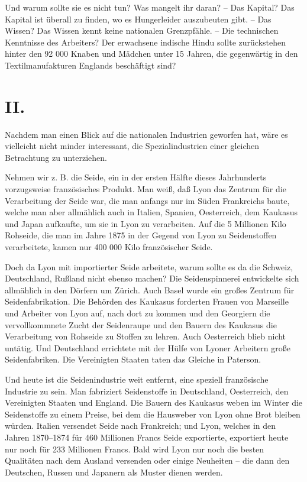 \documentclass{scrbook}
\begin{document}
Und warum sollte sie es nicht tun? Was mangelt ihr daran? – Das Kapital? Das Kapital ist überall zu finden, wo es Hungerleider auszubeuten gibt. – Das Wissen? Das Wissen kennt keine nationalen Grenzpfähle. – Die technischen Kenntnisse des Arbeiters? Der erwachsene indische Hindu sollte zurückstehen hinter den 92 000 Knaben und Mädchen unter 15 Jahren, die gegenwärtig in den Textilmanufakturen Englands beschäftigt sind?

\section*{II.}

Nachdem man einen Blick auf die nationalen Industrien geworfen hat, wäre es vielleicht nicht minder interessant, die Spezialindustrien einer gleichen Betrachtung zu unterziehen.

Nehmen wir z. B. die Seide, ein in der ersten Hälfte dieses Jahrhunderts vorzugsweise französisches Produkt. Man weiß, daß Lyon das Zentrum für die Verarbeitung der Seide war, die man anfangs nur im Süden Frankreichs baute, welche man aber allmählich auch in Italien, Spanien, Oesterreich, dem Kaukasus und Japan aufkaufte, um sie in Lyon zu verarbeiten. Auf die 5 Millionen Kilo Rohseide, die man im Jahre 1875 in der Gegend von Lyon zu Seidenstoffen verarbeitete, kamen nur 400 000 Kilo französischer Seide.

Doch da Lyon mit importierter Seide arbeitete, warum sollte es da die Schweiz, Deutschland, Rußland nicht ebenso machen? Die Seidenspinnerei entwickelte sich allmählich in den Dörfern um Zürich. Auch Basel wurde ein großes Zentrum für Seidenfabrikation. Die Behörden des Kaukasus forderten Frauen von Marseille und Arbeiter von Lyon auf, nach dort zu kommen und den Georgiern die vervollkommnete Zucht der Seidenraupe und den Bauern des Kaukasus die Verarbeitung von Rohseide zu Stoffen zu lehren. Auch Oesterreich blieb nicht untätig. Und Deutschland errichtete mit der Hülfe von Lyoner Arbeitern große Seidenfabriken. Die Vereinigten Staaten taten das Gleiche in Paterson.

Und heute ist die Seidenindustrie weit entfernt, eine speziell französische Industrie zu sein. Man fabriziert Seidenstoffe in Deutschland, Oesterreich, den Vereinigten Staaten und England. Die Bauern des Kaukasus weben im Winter die Seidenstoffe zu einem Preise, bei dem die Hausweber von Lyon ohne Brot bleiben würden. Italien versendet Seide nach Frankreich; und Lyon, welches in den Jahren 1870–1874 für 460 Millionen Francs Seide exportierte, exportiert heute nur noch für 233 Millionen Francs. Bald wird Lyon nur noch die besten Qualitäten nach dem Ausland versenden oder einige Neuheiten – die dann den Deutschen, Russen und Japanern als Muster dienen werden.
\end{document}
